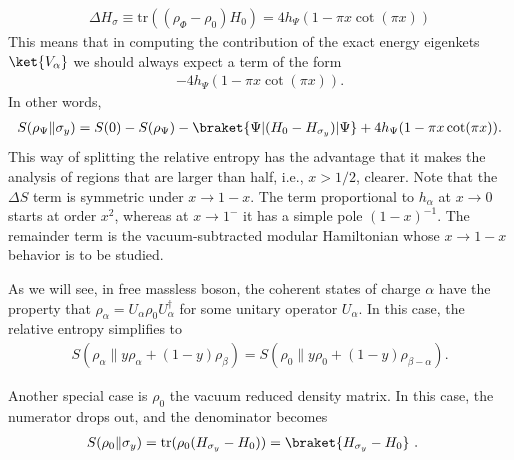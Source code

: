 \documentclass[11pt]{article}
\newcommand{\tr}{\mathrm{tr}}
\newcommand{\nn}{\nonumber}
\begin{document}
\begin{align}
\Delta H_\sigma\equiv \text{tr}((\rho_\Phi-\rho_0)H_0)=4h_{\Psi}(1-\pi x\cot(\pi x))
\end{align}
This means that in computing the contribution of the exact energy eigenkets $\ket{V_\alpha}$ we should always expect a term of the form
\begin{align}
  -4h_{\Psi}(1-\pi x\cot(\pi x)).
\end{align}
In other words,
\begin{align}
S(\rho_\Psi\|\sigma_y)=S(0)-S(\rho_\Psi)-\braket{\Psi|(H_0-H_{\sigma_y})|\Psi}+4h_\Psi(1-\pi x\cot(\pi x)).
\end{align}
This way of splitting the relative entropy has the advantage that it makes the analysis of regions that are larger than half, i.e., $x>1/2$, clearer. Note that the $\Delta S$ term is symmetric under $x\to 1-x$. The term proportional to $h_\alpha$ at $x\to 0$ starts at order $x^2$, whereas at $x\to 1^-$ it has a simple pole $(1-x)^{-1}$. The remainder term is the vacuum-subtracted modular Hamiltonian whose $x\to 1-x$ behavior is to be studied. 

As we will see, in free massless boson, the coherent states of charge $\alpha$ have the property that $\rho_\alpha=U_\alpha \rho_0 U_\alpha^\dagger$ for some unitary operator $U_\alpha$. In this case, the relative entropy simplifies to
\begin{align}
S(\rho_\alpha\|y\rho_\alpha+(1-y)\rho_\beta)=S(\rho_0\|y\rho_0+(1-y)\rho_{\beta-\alpha}).
\end{align}



Another special case is $\rho_0$ the vacuum reduced density matrix. In this case, the numerator drops out, and the denominator becomes
\begin{align}
S(\rho_0\|\sigma_y)&=\tr(\rho_0(H_{\sigma_y}-H_0))=\braket{H_{\sigma_y}-H_0}\ .
\end{align}
\end{document}
